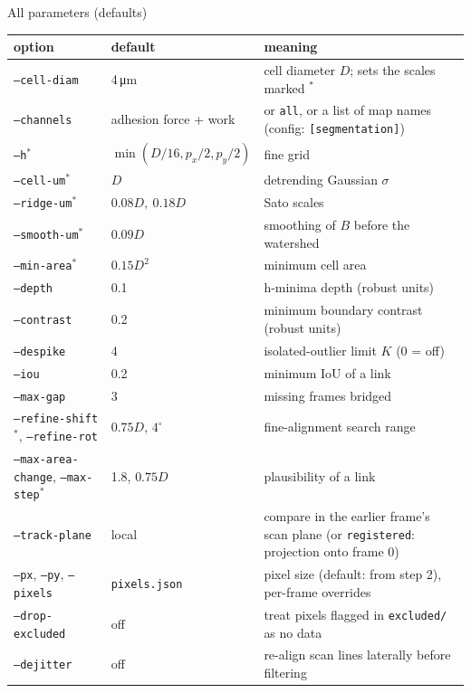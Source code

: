 \documentclass[aspectratio=169,9pt]{beamer}
\begin{document}
\begin{frame}{All parameters (defaults)}
\scriptsize
\begin{tabularx}{\textwidth}{@{}l l X@{}}
\toprule
option & default & meaning\\
\midrule
\texttt{--cell-diam} & 4\,\si{\micro\metre} & cell diameter $D$; sets the scales marked $^*$\\
\texttt{--channels} & adhesion force + work & or \texttt{all}, or a list of map names (config: \texttt{[segmentation]})\\
\texttt{--h}$^*$ & $\min(D/16,p_x/2,p_y/2)$ & fine grid\\
\texttt{--cell-um}$^*$ & $D$ & detrending Gaussian $\sigma$\\
\texttt{--ridge-um}$^*$ & $0.08D,\ 0.18D$ & Sato scales\\
\texttt{--smooth-um}$^*$ & $0.09D$ & smoothing of $B$ before the watershed\\
\texttt{--min-area}$^*$ & $0.15D^2$ & minimum cell area\\
\texttt{--depth} & 0.1 & h-minima depth (robust units)\\
\texttt{--contrast} & 0.2 & minimum boundary contrast (robust units)\\
\texttt{--despike} & 4 & isolated-outlier limit $K$ (0 = off)\\
\texttt{--iou} & 0.2 & minimum IoU of a link\\
\texttt{--max-gap} & 3 & missing frames bridged\\
\texttt{--refine-shift}$^*$, \texttt{--refine-rot} & $0.75D$, $4^\circ$ & fine-alignment search range\\
\texttt{--max-area-change}, \texttt{--max-step}$^*$ & 1.8, $0.75D$ & plausibility of a link\\
\texttt{--track-plane} & local & compare in the earlier frame's scan plane (or \texttt{registered}: projection onto frame 0)\\
\texttt{--px}, \texttt{--py}, \texttt{--pixels} & \texttt{pixels.json} & pixel size (default: from step 2), per-frame overrides\\
\texttt{--drop-excluded} & off & treat pixels flagged in \texttt{excluded/} as no data\\
\texttt{--dejitter} & off & re-align scan lines laterally before filtering\\
\bottomrule
\end{tabularx}
\end{frame}
\end{document}
